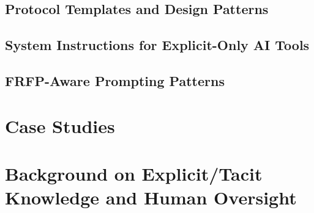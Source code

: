 \documentclass[preprints,accept]{Definitions/mdpi}
\theoremstyle{definition}
\begin{document}
\subsection{Protocol Templates and Design Patterns} %
\label{app:protocol-templates}

\subsection{System Instructions for Explicit-Only AI Tools} %
\label{app:system-instructions}

\subsection{FRFP-Aware Prompting Patterns} %
\label{app:prompting-patterns}


\section{Case Studies}
\label{app:case-studies}




\pagebreak
\section{Background on Explicit/Tacit Knowledge and Human Oversight}
\label{app:background}


\end{document}
